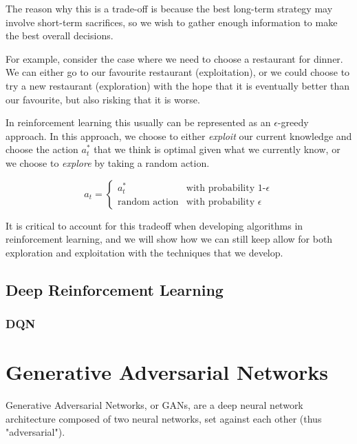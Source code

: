 The reason why this is a trade-off is because the best long-term strategy may involve short-term sacrifices, so we wish to gather enough information to make the best overall decisions.

For example, consider the case where we need to choose a restaurant for dinner. We can either go to our favourite restaurant (exploitation), or we could choose to try a new restaurant (exploration) with the hope that it is eventually better than our favourite, but also risking that it is worse.

In reinforcement learning this usually can be represented as an $\epsilon$-greedy approach. In this approach, we choose to either \textit{exploit} our current knowledge and choose the action $a_t^*$ that we think is optimal given what we currently know, or we choose to \textit{explore} by taking a random action.

\[
a_t =
\left\{
	\begin{array}{ll}
		a_t^*   & \mbox{with probability 1-$\epsilon$}\\
		\text{random action} & \mbox{with probability $\epsilon$}
	\end{array}
\right.
\]

It is critical to account for this tradeoff when developing algorithms in reinforcement learning, and we will show how we can still keep allow for both exploration and exploitation with the techniques that we develop.

\subsection{Deep Reinforcement Learning}
\subsubsection{DQN}


\section{Generative Adversarial Networks}
\label{sec:gan}
Generative Adversarial Networks, or GANs, are a deep neural network architecture composed of two neural networks, set against each other (thus "adversarial").

